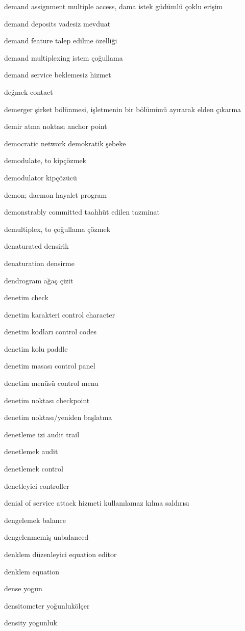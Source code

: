 \documentclass[12pt,fleqn]{article}\usepackage{../../common}
\begin{document}
demand assignment multiple access, dama istek güdümlü çoklu erişim

demand deposits vadesiz mevduat

demand feature talep edilme özelliği

demand multiplexing istem çoğullama

demand service beklemesiz hizmet

değmek contact

demerger şirket bölünmesi, işletmenin bir bölümünü ayırarak elden çıkarma

demir atma noktası anchor point

democratic network demokratik şebeke

demodulate, to kipçözmek

demodulator kipçözücü

demon; daemon hayalet program

demonstrably committed taahhüt edilen tazminat

demultiplex, to çoğullama çözmek

denaturated densirik

denaturation densirme

dendrogram ağaç çizit

denetim check

denetim karakteri control character

denetim kodları control codes

denetim kolu paddle

denetim masası control panel

denetim menüsü control menu

denetim noktası checkpoint

denetim noktası/yeniden başlatma

denetleme izi audit trail

denetlemek audit

denetlemek control

denetleyici controller

denial of service attack hizmeti kullanılamaz kılma saldırısı

dengelemek balance

dengelenmemiş unbalanced

denklem düzenleyici equation editor

denklem equation

dense yogun

densitometer yoğunlukölçer

density yogunluk
\end{document}
